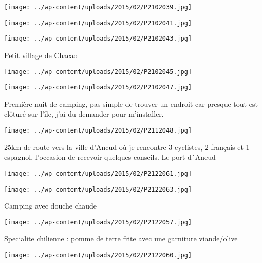 \centerline{\texttt{[image: ../wp-content/uploads/2015/02/P2102039.jpg]} } 
\newline
\centerline{\texttt{[image: ../wp-content/uploads/2015/02/P2102041.jpg]} } 
\newline
\centerline{\texttt{[image: ../wp-content/uploads/2015/02/P2102043.jpg]} } 
 \newline
 Petit village de Chacao \newline
 \newline
\centerline{\texttt{[image: ../wp-content/uploads/2015/02/P2102045.jpg]} } 
\newline
\centerline{\texttt{[image: ../wp-content/uploads/2015/02/P2102047.jpg]} } 
 \newline
 Première nuit de camping, pas simple de trouver un endroit car presque tout est clôturé sur l'île, j'ai du demander pour m'installer. \newline
 \newline
\centerline{\texttt{[image: ../wp-content/uploads/2015/02/P2112048.jpg]} } 
 25km de route vers la ville d'Ancud où je rencontre 3 cyclistes, 2 français et 1 espagnol, l'occasion de recevoir quelques conseils. \newline
 Le port d´Ancud \newline
 \newline
\centerline{\texttt{[image: ../wp-content/uploads/2015/02/P2122061.jpg]} } 
\newline
\centerline{\texttt{[image: ../wp-content/uploads/2015/02/P2122063.jpg]} } 
 \newline
 Camping avec douche chaude\newline
\centerline{\texttt{[image: ../wp-content/uploads/2015/02/P2122057.jpg]} } 
Specialite chilienne : pomme de terre frite avec une garniture viande/olive\newline
\centerline{\texttt{[image: ../wp-content/uploads/2015/02/P2122060.jpg]} } 
 \newline

\newpage
 
